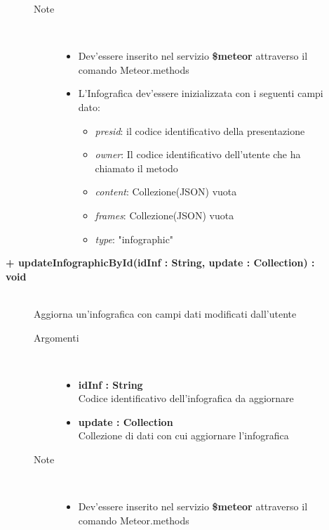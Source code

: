 \begin{description}
\begin{description}
\begin{description}
\begin{itemize}
				\end{itemize}
			\item[Note] \hfill \\
			\begin{itemize}
					\item Dev'essere inserito nel servizio \textbf{\$meteor} attraverso il comando Meteor.methods
					\item L'Infografica dev'essere inizializzata con i seguenti campi dato:
					\begin{itemize}
					\item \textit{presid}: il codice identificativo della presentazione
					\item \textit{owner}: Il codice identificativo dell'utente che ha chiamato il metodo
					\item \textit{content}: Collezione(JSON) vuota
					\item \textit{frames}: Collezione(JSON) vuota
					\item \textit{type}: "infographic"
					\end{itemize}
				\end{itemize}
		\end{description}
	\end{description}
	
	\begin{description}
		\item[\textbf{\color{blue}+ updateInfographicById(idInf : String, update : Collection) : void			}] \hfill \\
			Aggiorna un'infografica con campi dati modificati dall'utente
			
		\begin{description}
			\item[Argomenti] \hfill \\
				\begin{itemize}
				
					\item \textbf{idInf : String			} \hfill \\
					Codice identificativo dell'infografica da aggiornare
					\item \textbf{update : Collection			} \hfill \\
					Collezione di dati con cui aggiornare l'infografica
					
				\end{itemize}
			\item[Note] \hfill \\
			\begin{itemize}
					\item Dev'essere inserito nel servizio \textbf{\$meteor} attraverso il comando Meteor.methods
				\end{itemize}
		\end{description}
	\end{description}
	

\end{description}
